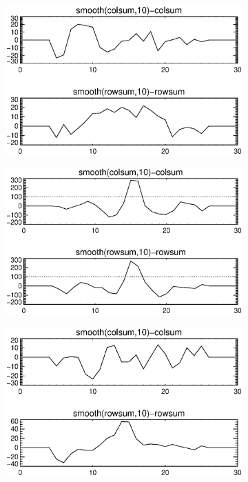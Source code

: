 \documentclass[10pt]{scrartcl}
\begin{document}
\begin{figure}[!ht]
    \begin{subfigure}[b]{.3\linewidth}
        \centering
        \includegraphics[width=1.0\linewidth]{../plots_tables_images/1d1dsums_5_0.eps}
    \end{subfigure}
    \begin{subfigure}[b]{.3\linewidth}
        \centering
        \includegraphics[width=1.0\linewidth]{../plots_tables_images/1d1dsums_5_6.eps}
    \end{subfigure}
    \begin{subfigure}[b]{.3\linewidth}
        \centering
        \includegraphics[width=1.0\linewidth]{../plots_tables_images/1d1dsums_5_9.eps}
    \end{subfigure}
\vspace{0.2in}


\end{figure}
\end{document}
